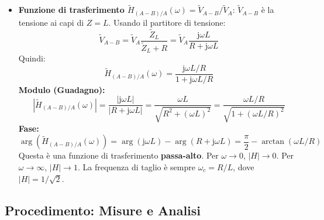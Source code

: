\documentclass[a4paper, 11pt]{article}
\newcommand{\jj}{\mathrm{j}} %
\newcommand{\abs}[1]{\left|#1\right|}
\newcommand{\argum}[1]{\arg\left(#1\right)}
\begin{document}
\begin{itemize}
    \item \textbf{Funzione di trasferimento $\tilde{H}_{(A-B)/A}(\omega) = \tilde{V}_{A-B} / \tilde{V}_A$}:
        $\tilde{V}_{A-B}$ è la tensione ai capi di $Z=L$. Usando il partitore di tensione:
        \begin{equation}
            \tilde{V}_{A-B} = \tilde{V}_A \frac{\tilde{Z}_L}{\tilde{Z}_L + R} = \tilde{V}_A \frac{\jj \omega L}{R + \jj \omega L}
        \end{equation}
        Quindi:
        \begin{equation} \label{eq:H_RL_VABVA}
            \tilde{H}_{(A-B)/A}(\omega) = \frac{\jj \omega L / R}{1 + \jj \omega L / R}
        \end{equation}
        \textbf{Modulo (Guadagno):}
        \begin{equation}
            \abs{\tilde{H}_{(A-B)/A}(\omega)} = \frac{\abs{\jj \omega L}}{\abs{R + \jj \omega L}} = \frac{\omega L}{\sqrt{R^2 + (\omega L)^2}} = \frac{\omega L / R}{\sqrt{1 + (\omega L / R)^2}}
        \end{equation}
        \textbf{Fase:}
        \begin{equation}
            \argum{\tilde{H}_{(A-B)/A}(\omega)} = \argum{\jj \omega L} - \argum{R + \jj \omega L} = \frac{\pi}{2} - \arctan(\omega L / R)
        \end{equation}
        Questa è una funzione di trasferimento \textbf{passa-alto}. Per $\omega \to 0$, $\abs{H} \to 0$. Per $\omega \to \infty$, $\abs{H} \to 1$. La frequenza di taglio è sempre $\omega_c = R/L$, dove $\abs{H} = 1/\sqrt{2}$.
\end{itemize}

\subsection{Procedimento: Misure e Analisi}
\end{document}
